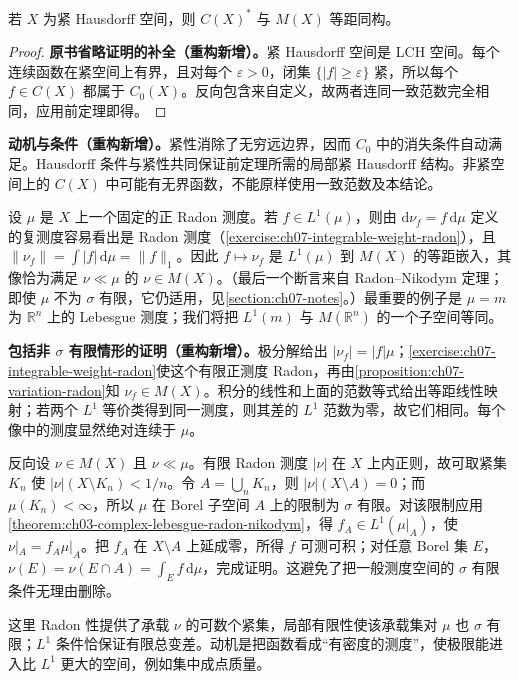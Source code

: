 \documentclass[../../main.tex]{subfiles}
\begin{document}
\begin{corollary}\label{corollary:ch07-riesz-compact}
若 $X$ 为紧 Hausdorff 空间，则 $C(X)^*$ 与 $M(X)$ 等距同构。
\end{corollary}
\begin{proof}
\textbf{原书省略证明的补全（重构新增）。}紧 Hausdorff 空间是 LCH 空间。每个连续函数在紧空间上有界，且对每个 $\varepsilon>0$，闭集 $\{|f|\geqslant\varepsilon\}$ 紧，所以每个 $f\in C(X)$ 都属于 $C_0(X)$。反向包含来自定义，故两者连同一致范数完全相同，应用前定理即得。
\end{proof}
\begin{remark}
\textbf{动机与条件（重构新增）。}紧性消除了无穷远边界，因而 $C_0$ 中的消失条件自动满足。Hausdorff 条件与紧性共同保证前定理所需的局部紧 Hausdorff 结构。非紧空间上的 $C(X)$ 中可能有无界函数，不能原样使用一致范数及本结论。
\end{remark}
设 $\mu$ 是 $X$ 上一个固定的正 Radon 测度。若 $f\in L^1(\mu)$，则由 $\mathrm d\nu_f=f\,\mathrm d\mu$ 定义的复测度容易看出是 Radon 测度（\cref{exercise:ch07-integrable-weight-radon}），且 $\|\nu_f\|=\int|f|\,\mathrm d\mu=\|f\|_1$。因此 $f\mapsto\nu_f$ 是 $L^1(\mu)$ 到 $M(X)$ 的等距嵌入，其像恰为满足 $\nu\ll\mu$ 的 $\nu\in M(X)$。（最后一个断言来自 Radon--Nikodym 定理；即使 $\mu$ 不为 $\sigma$ 有限，它仍适用，见\cref{section:ch07-notes}。）最重要的例子是 $\mu=m$ 为 $\mathbb R^n$ 上的 Lebesgue 测度；我们将把 $L^1(m)$ 与 $M(\mathbb R^n)$ 的一个子空间等同。
\begin{remark}
\textbf{包括非 $\sigma$ 有限情形的证明（重构新增）。}极分解给出 $|\nu_f|=|f|\mu$；\cref{exercise:ch07-integrable-weight-radon}使这个有限正测度 Radon，再由\cref{proposition:ch07-variation-radon}知 $\nu_f\in M(X)$。积分的线性和上面的范数等式给出等距线性映射；若两个 $L^1$ 等价类得到同一测度，则其差的 $L^1$ 范数为零，故它们相同。每个像中的测度显然绝对连续于 $\mu$。

反向设 $\nu\in M(X)$ 且 $\nu\ll\mu$。有限 Radon 测度 $|\nu|$ 在 $X$ 上内正则，故可取紧集 $K_n$ 使 $|\nu|(X\setminus K_n)<1/n$。令 $A=\bigcup_nK_n$，则 $|\nu|(X\setminus A)=0$；而 $\mu(K_n)<\infty$，所以 $\mu$ 在 Borel 子空间 $A$ 上的限制为 $\sigma$ 有限。对该限制应用\cref{theorem:ch03-complex-lebesgue-radon-nikodym}，得 $f_A\in L^1(\mu|_A)$，使 $\nu|_A=f_A\mu|_A$。把 $f_A$ 在 $X\setminus A$ 上延成零，所得 $f$ 可测可积；对任意 Borel 集 $E$，$\nu(E)=\nu(E\cap A)=\int_Ef\,\mathrm d\mu$，完成证明。这避免了把一般测度空间的 $\sigma$ 有限条件无理由删除。

这里 Radon 性提供了承载 $\nu$ 的可数个紧集，局部有限性使该承载集对 $\mu$ 也 $\sigma$ 有限；$L^1$ 条件恰保证有限总变差。动机是把函数看成“有密度的测度”，使极限能进入比 $L^1$ 更大的空间，例如集中成点质量。
\end{remark}
\end{document}
